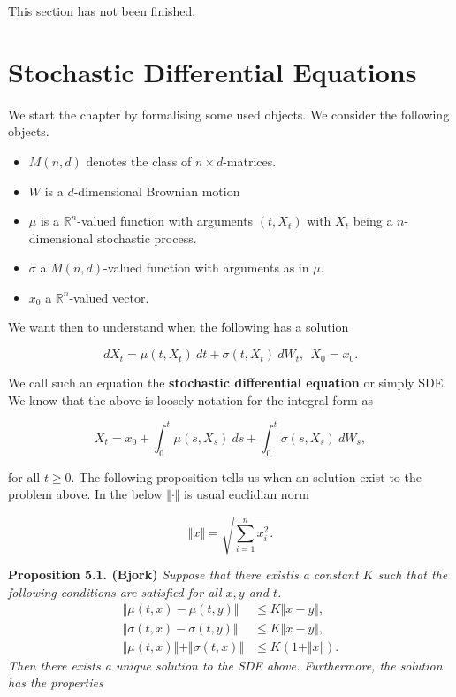 \documentclass[
]{book}
\providecommand{\tightlist}{%
  \setlength{\itemsep}{0pt}\setlength{\parskip}{0pt}}
\begin{document}
This section has not been finished.
\pagebreak

\hypertarget{stochastic-differential-equations}{%
\section{Stochastic Differential Equations}\label{stochastic-differential-equations}}

We start the chapter by formalising some used objects. We consider the following objects.

\begin{itemize}
\tightlist
\item
  \(M(n,d)\) denotes the class of \(n\times d\)-matrices.
\item
  \(W\) is a \(d\)-dimensional Brownian motion
\item
  \(\mu\) is a \(\mathbb{R}^n\)-valued function with arguments \((t,X_t)\) with \(X_t\) being a \(n\)-dimensional stochastic process.
\item
  \(\sigma\) a \(M(n,d)\)-valued function with arguments as in \(\mu\).
\item
  \(x_0\) a \(\mathbb{R}^n\)-valued vector.
\end{itemize}

We want then to understand when the following has a solution

\[
dX_t=\mu(t,X_t)\ dt + \sigma(t,X_t)\ dW_t,\ \ X_0=x_0.\tag{5.1/2}
\]

We call such an equation the \textbf{stochastic differential equation} or simply SDE. We know that the above is loosely notation for the integral form as

\[
X_t=x_0+\int_0^t\mu(s,X_s)\ ds +\int_0^t\sigma(s,X_s)\ dW_s,\tag{5.3}
\]

for all \(t\ge 0\). The following proposition tells us when an solution exist to the problem above. In the below \(\Vert \cdot \Vert\) is usual euclidian norm

\[
\Vert x\Vert=\sqrt{\sum_{i=1}^nx_i^2}.
\]

\textbf{Proposition 5.1. (Bjork)} \emph{Suppose that there existis a constant \(K\) such that the following conditions are satisfied for all \(x,y\) and \(t\).}
\begin{align*}
\Vert \mu(t,x) - \mu(t,y) \Vert &\le K\Vert x-y\Vert,\tag{5.6}\\
\Vert \sigma(t,x) - \sigma(t,y) \Vert &\le K\Vert x-y\Vert,\tag{5.7}\\
\Vert \mu(t,x) \Vert +\Vert \sigma(t,x) \Vert&\le K(1+\Vert x\Vert).\tag{5.8}
\end{align*}
\emph{Then there exists a unique solution to the SDE above. Furthermore, the solution has the properties}
\end{document}
